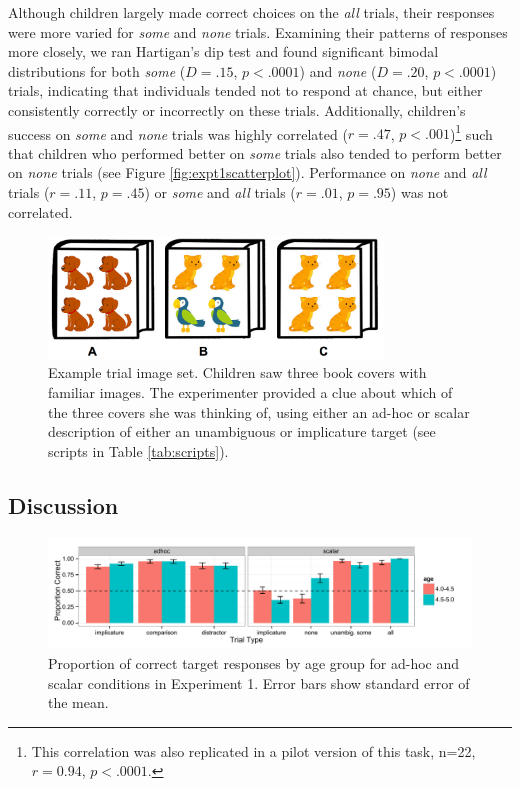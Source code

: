 \documentclass[10pt,letterpaper]{article}
\begin{document}
Although children largely made correct choices on the \emph{all} trials, their responses were more varied for \emph{some} and \emph{none} trials.  Examining their patterns of responses more closely, we ran Hartigan's dip test and found significant bimodal distributions for both \emph{some} ($D=.15$, $p<.0001$) and \emph{none} ($D=.20$, $p<.0001$) trials, indicating that individuals tended not to respond at chance, but either consistently correctly or incorrectly on these trials. Additionally, children's success on \emph{some} and \emph{none} trials was highly correlated ($r=.47$, $p<.001$)\footnote{This correlation was also replicated in a pilot version of this task, n=22, $r=0.94$, $p<.0001$.} such that children who performed better on \emph{some} trials also tended to perform better on \emph{none} trials (see Figure \ref{fig:expt1scatterplot}). Performance on \emph{none} and \emph{all} trials ($r=.11$, $p=.45$) or \emph{some} and \emph{all} trials ($r=.01$, $p=.95$) was not correlated.

 \begin{figure}[h] 
  \begin{center} 
    \includegraphics[width=3.5in]{figures/implicatures_demo_letters.png} 
    \caption{\label{fig:demo} Example trial image set. Children saw three book covers with familiar images. The experimenter provided a clue about which of the three covers she was thinking of, using either an ad-hoc or scalar description of either an unambiguous or implicature target (see scripts in Table \ref{tab:scripts}).}
    \end{center} 
\end{figure}

\subsection{Discussion}

\begin{figure}[t] 
  \begin{center} 
    \includegraphics[width=7.5in]{figures/implicatures_adhocScalar_long.pdf} 
    \caption{\label{fig:expt1} Proportion of correct target responses by age group for ad-hoc and scalar conditions in Experiment 1. Error bars show standard error of the mean.}
    \end{center} 
\end{figure}
\end{document}
